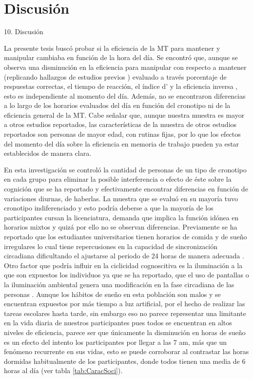 \documentclass[12pt,letterpaper,final]{article}
\let\cite\cite %
\begin{document}
\section{Discusión}

10.	Discusión


La presente tesis buscó probar si la eficiencia de la MT para mantener y manipular cambiaba en función de la hora del día. Se encontró que, aunque se observa una disminución en la eficiencia para manipular con respecto a mantener (replicando hallazgos de estudios previos \cite{DEsposito2015, Veltman2003}) evaluado a través porcentaje de respuestas correctas, el tiempo de reacción, el índice d’ y la eficiencia inversa , esto es independiente al momento del día. Además, no se encontraron diferencias a lo largo de los horarios evaluados del día en función del cronotipo ni de la eficiencia general de la MT. Cabe señalar que, aunque nuestra muestra es mayor a otros estudios reportados, las características de la muestra de otros estudios reportados son personas de mayor edad, con rutinas fijas, por lo que los efectos del momento del día sobre la eficiencia en memoria de trabajo pueden ya estar establecidos de manera clara.


En esta investigación se controló la cantidad de personas de un tipo de cronotipo en cada grupo para eliminar la posible interferencia o efecto de éste sobre la cognición que se ha reportado \cite{Schmidt2015} y efectivamente encontrar diferencias en función de variaciones diurnas, de haberlas. La muestra que se evaluó en su mayoría tuvo cronotipo indiferenciado y esto podría deberse a que la mayoría de los participantes cursan la licenciatura, demanda que implica la función idónea en horarios mixtos y quizá por ello no se observan diferencias. Previamente se ha reportado que los estudiantes universitarios tienen horarios de comida y de sueño irregulares \cite{Lund2010} lo cual tiene repercusiones en la capacidad de sincronización circadiana dificultando el ajustarse al periodo de 24 horas de manera adecuada \cite{Harma1993}. Otro factor que podría influir en la ciclicidad cognoscitiva es la iluminación a la que son expuestos los individuos ya que se ha reportado, que el uso de pantallas o la iluminación ambiental genera una modificación en la fase circadiana de las personas \cite{Chang2015,Chang2011,Gronfier2007}. Aunque los hábitos de sueño en esta población son malos y se encuentran expuestos por más tiempo a luz artificial, por el hecho de realizar las tareas escolares hasta tarde, sin embargo eso no parece representar una limitante en la vida diaria de nuestros participantes pues todos se encuentran en altos niveles de eficiencia, parece ser que únicamente la disminución en horas de sueño es un efecto del intento los participantes por llegar a las 7 am, más que un fenómeno recurrente en sus vidas, esto se puede corroborar al contrastar las horas dormidas habitualmente de los participantes, donde todos tienen una media de 6 horas al día (ver tabla \ref{tab:CaracSoci}).
 
\end{document}
